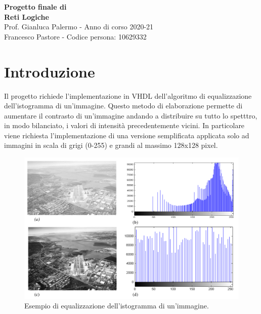 \documentclass{article}
\begin{document}
\begin{titlepage}
    \centering
    \vspace*{\fill}
    \Huge\textbf{Progetto finale di \\ Reti Logiche}\\
    \vspace{5mm} %
    \Large Prof. Gianluca Palermo - Anno di corso 2020-21\\
    \vspace{5mm} %
    \large Francesco Pastore - Codice persona: 10629332\\
    \vspace{100mm}
    \vspace*{\fill}
\end{titlepage}

\thispagestyle{empty}
\tableofcontents
\pagebreak

\section{Introduzione}
Il progetto richiede l'implementazione in VHDL dell'algoritmo di equalizzazione dell'istogramma di un'immagine. Questo metodo di elaborazione permette di aumentare il contrasto di un'immagine andando a distribuire su tutto lo spetttro, in modo bilanciato, i valori di intensità precedentemente vicini. In particolare viene richiesta l'implementazione di una versione semplificata applicata solo ad immagini in scala di grigi (0-255) e grandi al massimo 128x128 pixel.
\begin{figure}[h]
    \includegraphics[scale=0.25]{equalization.png}
    \centering
    \caption{Esempio di equalizzazione dell'istogramma di un'immagine. \cite{equalization}}
\end{figure}
\end{document}
